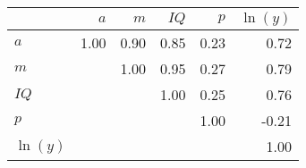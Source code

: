 \begin{tabular}{lrrrrr}
\hline
 & $a$  & $m$  & $IQ$  & $p$  & $\ln(y)$  \\ 
\hline
$a$ & 1.00  & 0.90  & 0.85  & 0.23  & 0.72  \\ 
$m$ &   & 1.00  & 0.95  & 0.27  & 0.79  \\ 
$IQ$ &   &   & 1.00  & 0.25  & 0.76  \\ 
$p$ &   &   &   & 1.00  & -0.21  \\ 
$\ln(y)$ &   &   &   &   & 1.00  \\ 
\hline
\end{tabular}%
